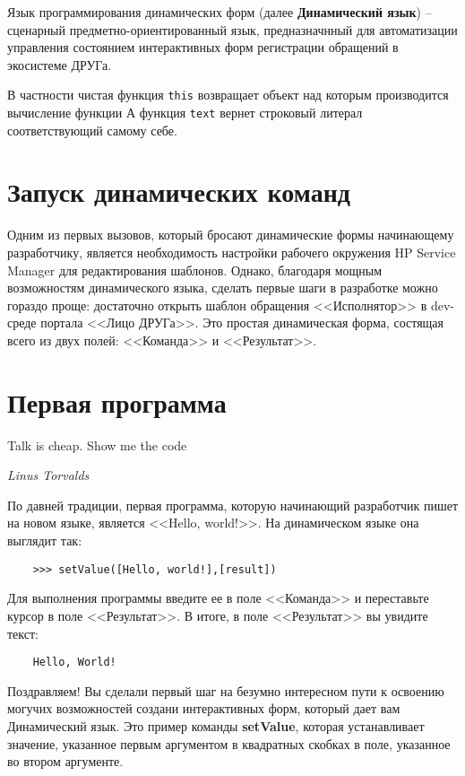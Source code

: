 \documentclass[../index.tex]{subfiles}
\begin{document}
        Язык программирования динамических форм (далее \textbf{Динамический язык}) -- сценарный предметно-ориентированный язык, предназначнный для автоматизации управления состоянием 
        интерактивных форм регистрации обращений в экосистеме ДРУГа.
        
               
        В частности чистая функция \texttt{this} возвращает объект над которым производится вычисление функции
        А функция \texttt{text} вернет строковый литерал соответствующий самому себе.
        

	\section{Запуск динамических команд}
	Одним из первых вызовов, который бросают динамические формы начинающему разработчику, является необходимость настройки рабочего окружения HP Service Manager для редактирования шаблонов. Однако, благодаря мощным возможностям динамического языка, сделать первые шаги в разработке можно гораздо проще: достаточно открыть шаблон обращения <<Исполнятор>> в dev-среде портала <<Лицо ДРУГа>>. Это простая динамическая форма, состящая всего из двух полей: <<Команда>> и <<Результат>>.
	
	\section{Первая программа}
		
	\epigraph{Talk is cheap. Show me the code}{\textit{Linus Torvalds}}
	
	По давней традиции, первая программа, которую начинающий разработчик пишет на новом языке, является <<Hello, world!>>. На динамическом языке она выглядит так:
	\begin{verbatim}
	>>> setValue([Hello, world!],[result])
	\end{verbatim}
	
	Для выполнения программы введите ее в поле <<Команда>> и переставьте курсор в поле <<Результат>>. В итоге, в поле <<Результат>> вы увидите текст:
	
	\begin{verbatim}
	Hello, World!
	\end{verbatim}
	
	Поздравляем! Вы сделали первый шаг на безумно интересном пути к освоению могучих возможностей создани интерактивных форм, который дает вам Динамический язык.
	Это пример команды {\bf setValue}, которая устанавливает значение, указанное первым аргументом в квадратных скобках в поле, указанное во втором аргументе.
	
\end{document}
